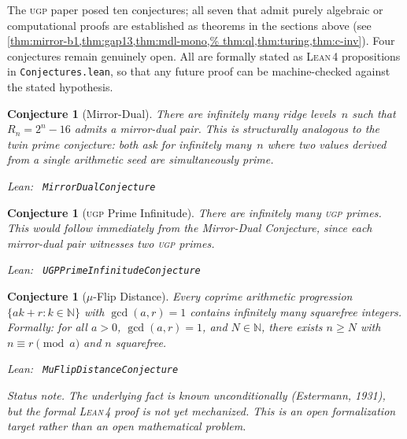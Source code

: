 \documentclass[11pt,a4paper]{article}
\newenvironment{leanref}%
  {\par\smallskip\noindent\begingroup\raggedright\textup{Lean:}~}%
  {\par\endgroup}
\newtheorem{conjecture}[theorem]{Conjecture}
\theoremstyle{definition}
\newcommand{\ugp}{\textsc{ugp}}
\newcommand{\lean}{\textsc{Lean}\,4}
\newcommand{\N}{\mathbb{N}}
\begin{document}
The \ugp{} paper posed ten conjectures; all seven that admit purely
algebraic or computational proofs are established as theorems in the
sections above (see \cref{thm:mirror-b1,thm:gap13,thm:mdl-mono,%
thm:ql,thm:turing,thm:c-inv}).  Four conjectures remain genuinely open.
All are formally stated as \lean{} propositions in \texttt{Conjectures.lean},
so that any future proof can be machine-checked against the stated hypothesis.

\begin{conjecture}[Mirror-Dual]\label{conj:mirror-final}
There are infinitely many ridge levels~$n$ such that $R_n = 2^n - 16$
admits a mirror-dual pair.  This is structurally analogous to the
twin prime conjecture: both ask for infinitely many~$n$ where two
values derived from a single arithmetic seed are simultaneously prime.

\begin{leanref} \lstinline|MirrorDualConjecture|
\end{leanref}
\end{conjecture}

\begin{conjecture}[\ugp{} Prime Infinitude]\label{conj:ugp-inf-final}
There are infinitely many \ugp{} primes.  This would follow immediately
from the Mirror-Dual Conjecture, since each mirror-dual pair witnesses
two \ugp{} primes.

\begin{leanref} \lstinline|UGPPrimeInfinitudeConjecture|
\end{leanref}
\end{conjecture}

\begin{conjecture}[$\mu$-Flip Distance]\label{conj:mu-flip-final}
Every coprime arithmetic progression $\{ak + r : k \in \N\}$ with
$\gcd(a,r) = 1$ contains infinitely many squarefree integers.
Formally: for all $a > 0$, $\gcd(a,r) = 1$, and $N \in \N$,
there exists $n \ge N$ with $n \equiv r \pmod{a}$ and $n$ squarefree.

\begin{leanref} \lstinline|MuFlipDistanceConjecture|

\smallskip\noindent
\textit{Status note.} The underlying fact is known unconditionally
(Estermann, 1931), but the formal \lean{} proof is not yet mechanized.
This is an open \emph{formalization} target rather than an open
mathematical problem.
\end{leanref}
\end{conjecture}
\end{document}
